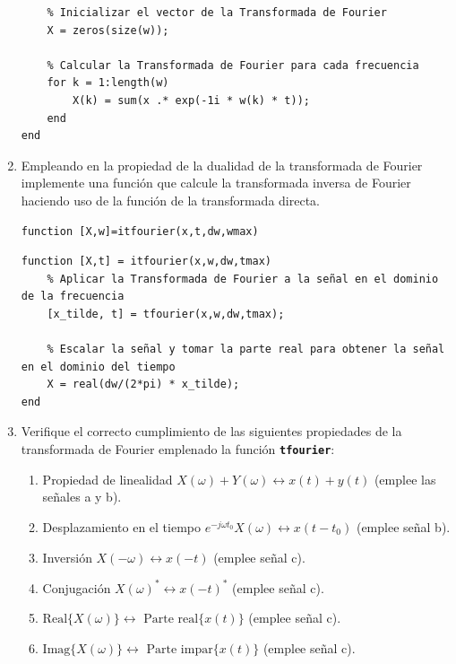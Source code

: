 \documentclass{article}
\newcommand{\code}[1]{\texttt{\textbf{#1}}}
\begin{document}
\begin{enumerate}[leftmargin=*]
\begin{lstlisting}
    % Inicializar el vector de la Transformada de Fourier
    X = zeros(size(w));

    % Calcular la Transformada de Fourier para cada frecuencia
    for k = 1:length(w)
        X(k) = sum(x .* exp(-1i * w(k) * t));
    end
end
\end{lstlisting}
\item Empleando en la propiedad de la dualidad de la transformada de Fourier implemente una función que calcule la transformada inversa de Fourier haciendo uso de la función de la transformada directa.
\begin{lstlisting}
function [X,w]=itfourier(x,t,dw,wmax)
\end{lstlisting}


\begin{lstlisting}
function [X,t] = itfourier(x,w,dw,tmax)
    % Aplicar la Transformada de Fourier a la señal en el dominio de la frecuencia
    [x_tilde, t] = tfourier(x,w,dw,tmax);

    % Escalar la señal y tomar la parte real para obtener la señal en el dominio del tiempo
    X = real(dw/(2*pi) * x_tilde);
end
\end{lstlisting}

\item Verifique el correcto cumplimiento de las siguientes propiedades de la transformada de Fourier emplenado la función \code{tfourier}:
\begin{enumerate}[label=\roman*)]
\item Propiedad de linealidad $X(\omega)+Y(\omega)\longleftrightarrow x(t)+y(t)$ (emplee las señales a y b).
\item Desplazamiento en el tiempo $e^{-j\omega t_0}X(\omega)\longleftrightarrow x(t-t_0)$ (emplee señal b).
\item Inversión $X(-\omega)\longleftrightarrow x(-t)$ (emplee señal c).
\item Conjugación $X(\omega)^*\longleftrightarrow x(-t)^*$ (emplee señal c).
\item $\mathrm{Real}\{X(\omega)\}\longleftrightarrow\text{ Parte real}\{x(t)\}$ (emplee señal c).
\item $\mathrm{Imag}\{X(\omega)\}\longleftrightarrow\text{ Parte impar}\{x(t)\}$ (emplee señal c).
\end{enumerate}
\end{enumerate}
\end{document}

